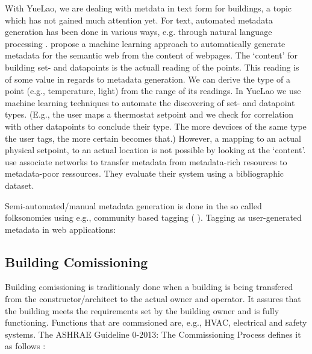 With YueLao, we are dealing with metdata in text form for buildings, a topic which has not gained much attention yet.
For text, automated metadata generation has been done in various ways, e.g. through natural language processing \cite{Yang2005}.
\cite{Yang2005} propose a machine learning approach to automatically generate metadata for the semantic web from the content of webpages.
The `content' for building set- and datapoints is the actuall reading of the points.
This reading is of some value in regards to metadata generation. We can derive the type of a point (e.g., temperature, light) from the range of its readings. 
In YueLao we use machine learning techniques to automate the discovering of set- and datapoint types.
(E.g., the user maps a thermostat setpoint and we check for correlation with other datapoints to conclude their type. The more devcices of the same type the user tags, the more certain becomes that.)
However, a mapping to an actual physical setpoint, to an actual location is not possible by looking at the `content'.
\cite{Rodriguez2008} use associate networks to transfer metadata from metadata-rich resources to metadata-poor ressources. They evaluate their system using a bibliographic dataset. 


Semi-automated/manual metadata generation is done in the so called folksonomies using e.g., community based tagging (\cite{Mathes2004} \cite{Golder2006}).
Tagging as user-generated metadata in web applications: \cite{budura2008tag}



\subsection{Building Comissioning} %
\label{sub:building_comissioning}

Building comissioning is traditionaly done when a building is being transfered from the constructor/architect to the actual owner and operator. It assures that the building meets the requirements set by the building owner and is fully functioning. Functions that are commsioned are, e.g., HVAC, electrical and safety systems.
The ASHRAE Guideline 0-2013: The Commissioning Process defines it as follows \cite{ASHRAE:2013aa}:

